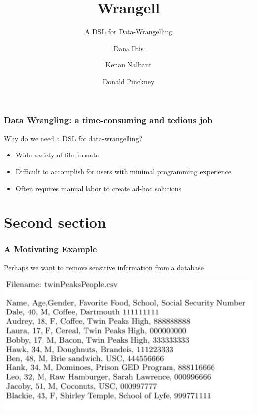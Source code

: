 \documentclass{beamer}
\title[Wrangell] %
{Wrangell}
\subtitle{A DSL for Data-Wrangelling}
\author[Dana Iltis, Kenan Nalbant, Donald Pinckney] %
{Dana Iltis \and Kenan Nalbant \and Donald Pinckney}
\begin{document}
\frame{\titlepage}

\begin{frame}
\frametitle{Data Wrangling: a time-consuming and tedious job}
Why do we need a DSL for data-wrangelling?
\begin{itemize}
    \item<1-> Wide variety of file formats
    \item<1-> Difficult to accomplish for users with minimal programming experience
    \item<1-> Often requires manual labor to create ad-hoc solutions
\end{itemize}
\end{frame}


\section{Second section}

\begin{frame}
\frametitle{A Motivating Example}
Perhaps we want to remove sensitive information from a database

\includegraphics[scale=0.35]{screen}


\end{frame}
\end{document}
